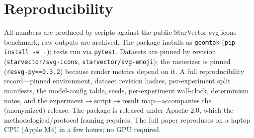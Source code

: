 \documentclass[11pt]{article}
\begin{document}
\section{Reproducibility}
\label{sec:repro}
All numbers are produced by scripts against the public StarVector svg-icons benchmark; raw outputs are archived. The package installs as \texttt{geomtok} (\texttt{pip install -e .}); tests run via \texttt{pytest}. Datasets are pinned by revision (\texttt{starvector/svg-icons}, \texttt{starvector/svg-emoji}); the rasterizer is pinned (\texttt{resvg-py==0.3.2}) because render metrics depend on it. A full reproducibility record---pinned environment, dataset revision hashes, per-experiment split manifests, the model-config table, seeds, per-experiment wall-clock, determinism notes, and the experiment$\rightarrow$script$\rightarrow$result map---accompanies the (anonymized) release. The package is released under Apache-2.0, which the methodological/protocol framing requires. The full paper reproduces on a laptop CPU (Apple M4) in a few hours; no GPU required.
\end{document}
